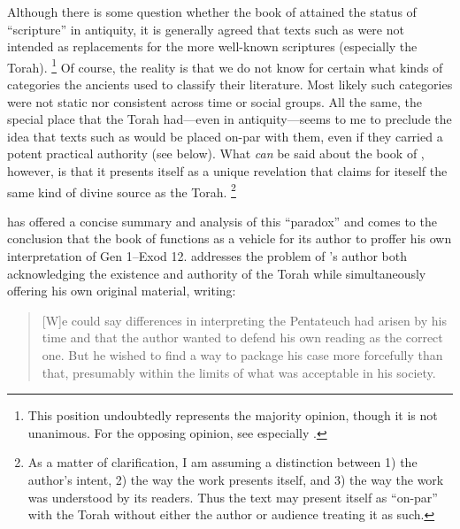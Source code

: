 Although there is some question whether the book of \jub attained the status of ``scripture'' in antiquity, it is generally agreed that \psgraphical texts such as \jub were not intended as replacements for the more well-known scriptures (especially the Torah).%
    \footnote{This position undoubtedly represents the majority opinion, though it is not unanimous. For the opposing opinion, see especially \cite{wacholder_kampen-etal1997}.}
Of course, the reality is that we do not know for certain what kinds of categories the ancients used to classify their literature. Most likely such categories were not static nor consistent across time or social groups. All the same, the special place that the Torah had---even in antiquity---seems to me to preclude the idea that \psgraphical  texts such as \jub would be placed on-par with them, even if they carried a potent practical authority (see below). What \emph{can} be said about the book of \jub, however, is that it presents itself as a unique revelation that claims for iteself the same kind of divine source as the Torah.%
    \footnote{As a matter of clarification, I am assuming a distinction between 1) the author's intent, 2) the way the work presents itself, and 3) the way the work was understood by its readers. Thus the text may present itself as ``on-par'' with the Torah without either the author or audience treating it as such.}

\vanderkam has offered a concise summary and analysis of this ``\psgraphical paradox'' and comes to the conclusion that the book of \jub functions as a vehicle for its author to proffer his own interpretation of Gen 1--Exod 12. \vanderkam addresses the problem of \jub's author both acknowledging the existence and authority of the Torah while simultaneously offering his own original material, writing:

\begin{quote}
    [W]e could say differences in interpreting the Pentateuch had arisen by his time and that the author wanted to defend his own reading as the correct one. But he wished to find a way to package his case more forcefully than that, presumably within the limits of what was acceptable in his society.\autocite[28]{vanderkam_metso-etal2010}
\end{quote}

